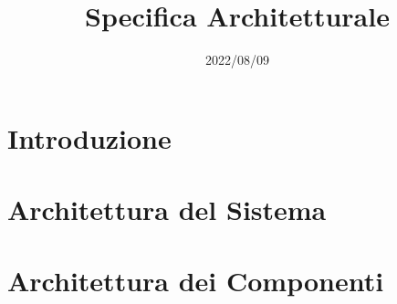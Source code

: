 \documentclass{classes/base}
\title{Specifica Architetturale}
\date{2022/08/09}
\author{}
\begin{document}
	\maketitle
	\newpage
	
	\newpage
	\tableofcontents
	\newpage
	\listoffigures
  
	\newpage
	\section{Introduzione}
	

	\newpage
	\section{Architettura del Sistema}
	

	\newpage
	\section{Architettura dei Componenti}
	
\end{document}
